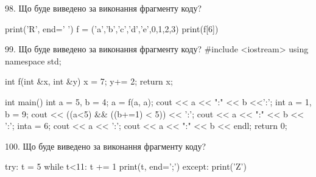 \documentclass[11pt]{article}
\begin{document}
98. Що буде виведено за виконання фрагменту коду?

print('R', end=' ')
f = ('a','b','c','d','e',0,1,2,3)
print(f[6])



99. Що буде виведено за виконання фрагменту коду?
#include <iostream>
using namespace std;

int f(int &x, int &y){
    x = 7;
    y+= 2;
    return x;
}

int main(){
    int a = 5, b = 4;
    a = f(a, a);
    cout << a << ":" << b <<':';
    {
        int a = 1, b = 9;
        cout << ((a<5) && ((b+=1) < 5)) << ':';
        cout << a << ":" << b << ':';
    }
    {
        inta = 6;
        cout << a << ':';
    }
    cout << a << ":" << b << endl;
    return 0;
}



100. Що буде виведено за виконання фрагменту коду?

try:
    t = 5
    while t<11:
        t += 1
    print(t, end=';')
except:
    print('Z')



\newpage
\end{document}
